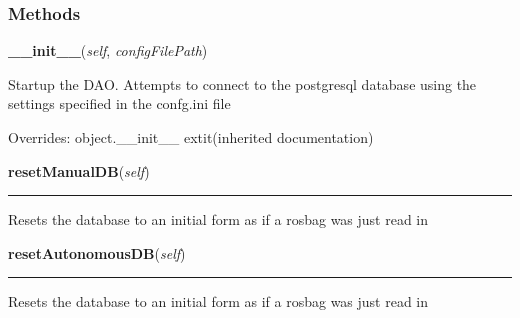   \subsubsection{Methods}

    \vspace{0.5ex}

\hspace{.8\funcindent}\begin{boxedminipage}{\funcwidth}

    \raggedright \textbf{\_\_init\_\_}(\textit{self}, \textit{configFilePath})

\setlength{\parskip}{2ex}
    Startup the DAO. Attempts to connect to the postgresql database using 
    the settings specified in the confg.ini file

\setlength{\parskip}{1ex}
      Overrides: object.\_\_init\_\_ 	extit{(inherited documentation)}

    \end{boxedminipage}

    \label{src:dao:util_dao:UtilDAO:resetManualDB}

    \vspace{0.5ex}

\hspace{.8\funcindent}\begin{boxedminipage}{\funcwidth}

    \raggedright \textbf{resetManualDB}(\textit{self})

    \vspace{-1.5ex}

    \rule{\textwidth}{0.5\fboxrule}
\setlength{\parskip}{2ex}
    Resets the database to an initial form as if a rosbag was just read in

\setlength{\parskip}{1ex}
    \end{boxedminipage}

    \label{src:dao:util_dao:UtilDAO:resetAutonomousDB}

    \vspace{0.5ex}

\hspace{.8\funcindent}\begin{boxedminipage}{\funcwidth}

    \raggedright \textbf{resetAutonomousDB}(\textit{self})

    \vspace{-1.5ex}

    \rule{\textwidth}{0.5\fboxrule}
\setlength{\parskip}{2ex}
    Resets the database to an initial form as if a rosbag was just read in

\setlength{\parskip}{1ex}
    \end{boxedminipage}



